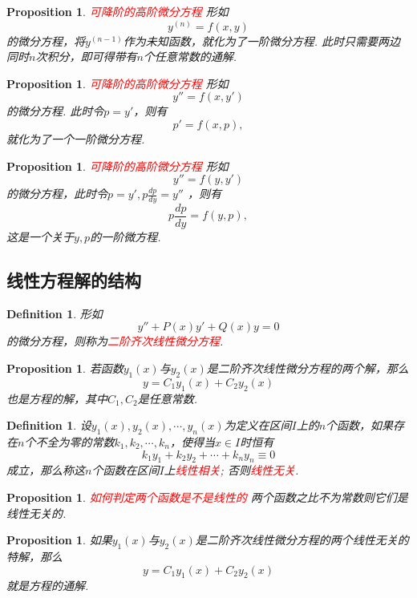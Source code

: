 \documentclass{article}
\newtheorem{proposition}[theorem]{Proposition}
\newtheorem{definition}[theorem]{Definition}
\newcommand{\redt}[1]{\textcolor{red}{#1}}
\begin{document}
\begin{proposition}
\rm \redt{可降阶的高阶微分方程} 形如
$$
y^{(n)}=f(x,y)
$$
的微分方程，将$y^{(n-1)}$作为未知函数，就化为了一阶微分方程. 此时只需要两边同时$n$次积分，即可得带有$n$个任意常数的通解.  
\end{proposition}

\begin{proposition}
\rm \redt{可降阶的高阶微分方程} 形如
$$
y'' = f(x,y')
$$
的微分方程. 此时令$p=y'$，则有
$$
p' = f(x,p),
$$
就化为了一个一阶微分方程. 
\end{proposition}

\begin{proposition}
\rm \redt{可降阶的高阶微分方程} 形如
$$
y'' = f(y,y')
$$
的微分方程，此时令$p = y', p \frac{dp}{dy} = y''$ ，则有
$$
p \frac{dp}{dy} = f(y,p),
$$
这是一个关于$y,p$的一阶微方程. 
\end{proposition}

\subsection{线性方程解的结构}

\begin{definition}
\rm 形如
$$
y''+P(x)y'+Q(x)y = 0
$$
的微分方程，则称为\redt{二阶齐次线性微分方程}.
\end{definition}

\begin{proposition}
\rm 若函数$y_1(x)$与$y_2(x)$是二阶齐次线性微分方程的两个解，那么
$$
y = C_1y_1(x) + C_2y_2(x)
$$
也是方程的解，其中$C_1,C_2$是任意常数. 
\end{proposition}

\begin{definition}
\rm 设$y_1(x),y_2(x),\cdots,y_n(x)$为定义在区间$I$上的$n$个函数，如果存在$n$个不全为零的常数$k_1,k_2,\cdots,k_n$，使得当$x \in I$时恒有
$$
k_1 y_1 + k_2y_2 +\cdots + k_ny_n \equiv 0
$$
成立，那么称这$n$个函数在区间$I$上\redt{线性相关}; 否则\redt{线性无关}. 
\end{definition}

\begin{proposition}
\rm \redt{如何判定两个函数是不是线性的} 两个函数之比不为常数则它们是线性无关的. 
\end{proposition}

\begin{proposition}
\rm 如果$y_1(x)$与$y_2(x)$是二阶齐次线性微分方程的两个线性无关的特解，那么
$$
y = C_1y_1(x) + C_2y_2(x)
$$
就是方程的通解. 
\end{proposition}
\end{document}
